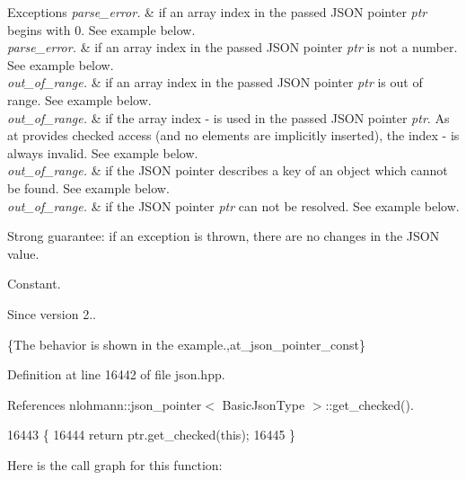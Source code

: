 \begin{DoxyExceptions}{Exceptions}
{\em parse\+\_\+error.} & if an array index in the passed J\+S\+ON pointer {\itshape ptr} begins with \textquotesingle{}0\textquotesingle{}. See example below.\\
\hline
{\em parse\+\_\+error.} & if an array index in the passed J\+S\+ON pointer {\itshape ptr} is not a number. See example below.\\
\hline
{\em out\+\_\+of\+\_\+range.} & if an array index in the passed J\+S\+ON pointer {\itshape ptr} is out of range. See example below.\\
\hline
{\em out\+\_\+of\+\_\+range.} & if the array index \textquotesingle{}-\/\textquotesingle{} is used in the passed J\+S\+ON pointer {\itshape ptr}. As {\ttfamily at} provides checked access (and no elements are implicitly inserted), the index \textquotesingle{}-\/\textquotesingle{} is always invalid. See example below.\\
\hline
{\em out\+\_\+of\+\_\+range.} & if the J\+S\+ON pointer describes a key of an object which cannot be found. See example below.\\
\hline
{\em out\+\_\+of\+\_\+range.} & if the J\+S\+ON pointer {\itshape ptr} can not be resolved. See example below.\\
\hline
\end{DoxyExceptions}
Strong guarantee\+: if an exception is thrown, there are no changes in the J\+S\+ON value.

Constant.

\begin{DoxySince}{Since}
version 2..
\end{DoxySince}
\{The behavior is shown in the example.,at\+\_\+json\+\_\+pointer\+\_\+const\} 

Definition at line 16442 of file json.\+hpp.



References nlohmann\+::json\+\_\+pointer$<$ Basic\+Json\+Type $>$\+::get\+\_\+checked().


\begin{DoxyCode}
16443     \{
16444         \textcolor{keywordflow}{return} ptr.get\_checked(\textcolor{keyword}{this});
16445     \}
\end{DoxyCode}
Here is the call graph for this function\+:
\mbox{\label{classnlohmann_1_1basic__json_a011397134847f36db0ed7d7a93753677}} 
